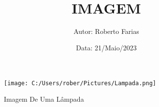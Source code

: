 \documentclass[a4paper,12pt]{article}
\title{\textbf{IMAGEM}}
\author{Autor: Roberto Farias}
\date{Data: 21/Maio/2023}
\begin{document}
\maketitle %

\begin{figure}[h]
	\centering
	\texttt{[image: C:/Users/rober/Pictures/Lampada.png]}
	\label{ImagemLampada}
	\caption{Imagem De Uma Lâmpada}
\end{figure}
\end{document}
